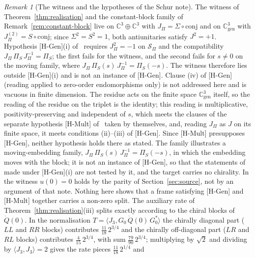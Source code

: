 \documentclass[11pt]{article}
\theoremstyle{definition}
\theoremstyle{remark}
\newtheorem{remark}{Remark}
\newcommand{\JPi}{J_{\Pi}}
\newcommand{\Jthree}{J_{3}}
\newcommand{\Cgen}{\mathbb{C}^{3}_{\mathrm{gen}}}
\newcommand{\PiS}{\Pi_{S}}
\begin{document}
    \begin{remark}[The witness and the hypotheses of the Schur note]
      \label{rem:witness-scope}
      The witness of Theorem~\ref{thm:realisation} and the constant-block family of
      Remark~\ref{rem:constant-block} live on $\mathbb{C}^3 \oplus \mathbb{C}^3$ with $\JPi = \Sigma \circ \mathrm{conj}$
      and on $\Cgen$ with $\JPi^{(2)} = S \circ \mathrm{conj}$; since $\Sigma^2 = S^2 = 1$, both antiunitaries satisfy
      $J^2 = +1$.
      Hypothesis [H-Gen](i) of~\cite{Beau2026prs} requires $\JPi^2 = -1$ on $\mathcal{S}_\Pi$ and the compatibility
      $\JPi\,\PiS\,\JPi^{-1} = \PiS$; the first fails for the witness, and the second fails for $s \neq 0$ on the moving
      family, where $\JPi\,\PiS(s)\,\JPi^{-1} = \PiS(-s)$.
      The witness therefore lies outside [H-Gen](i) and is not an instance of [H-Gen].
      Clause (iv) of [H-Gen] (reading applied to zero-order endomorphisms only) is not addressed here and is vacuous in
      finite dimension.
      The residue acts on the finite space $\Cgen$ itself, so the reading of the residue on the triplet is the identity;
      this reading is multiplicative, positivity-preserving and independent of $s$, which meets the clauses of the
      separate hypothesis [H-Mult] of~\cite{Beau2026prs} taken by themselves, and, reading $\JPi$ as $J$ on its finite
      space, it meets conditions (ii)--(iii) of [H-Gen].
      Since [H-Mult] presupposes [H-Gen], neither hypothesis holds there as stated.
      The family illustrates a moving-embedding family, $\JPi\,\PiS(s)\,\JPi^{-1} = \PiS(-s)$, in which the embedding
      moves with the block; it is not an instance of [H-Gen], so that the statements of~\cite{Beau2026prs} made under
      [H-Gen](i) are not tested by it, and the target carries no chirality.
      In the witness $u(0) = 0$ holds by the parity of Section~\ref{sec:source}, not by an argument of that note.
      Nothing here shows that a frame satisfying [H-Gen] and [H-Mult] together carries a non-zero split.
      The auxiliary rate of Theorem~\ref{thm:realisation}(iii) splits exactly according to the chiral blocks of
      $\dot Q(0)$.
      In the normalisation $T = \langle \Jthree, G_0\,\dot Q(0)\,G_0^{*}\rangle$ the chirally diagonal part ($LL$ and
      $RR$ blocks) contributes $\tfrac{11}{18}\,2^{3/4}$ and the chirally off-diagonal part ($LR$ and $RL$ blocks)
      contributes $\tfrac{4}{15}\,2^{3/4}$, with sum $\tfrac{79}{90}\,2^{3/4}$; multiplying by $\sqrt{2}$ and dividing by
      $\langle \Jthree, \Jthree\rangle = 2$ gives the rate pieces $\tfrac{11}{18}\,2^{1/4}$ and

\end{remark}
\end{document}
